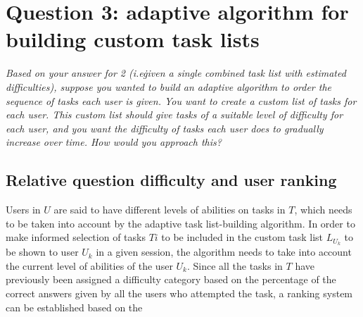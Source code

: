 \chapter{Question 3: adaptive algorithm for building custom task lists} \label{ch:q3_adaptive_algorithm}

\textit{Based on your answer for 2 (i.e\. given a single combined task list with estimated difficulties), suppose you wanted to build an adaptive algorithm to order the sequence of tasks each user is given.
You want to create a custom list of tasks for each user.
This custom list should give tasks of a suitable level of difficulty for each user, and you want the difficulty of tasks each user does to gradually increase over time.
How would you approach this?}

\section{Relative question difficulty and user ranking} \label{sec:relative_difficulty}

Users in $U$ are said to have different levels of abilities on tasks in $T$, which needs to be taken into account by the adaptive task list-building algorithm.
In order to make informed selection of tasks $Ti$ to be included in the custom task list $L_U_k$ to be shown to user $U_k$ in a given session, the algorithm needs to take into account the current level of abilities of the user $U_k$.
Since all the tasks in $T$ have previously been assigned a difficulty category based on the percentage of the correct answers given by all the users who attempted the task, a ranking system can be established based on the

